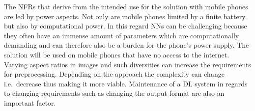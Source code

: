 The \acp{NFR} that derive from the intended use for the solution with mobile phones are led by
power aspects.
Not only are mobile phones limited by a finite battery but also by computational power.
In this regard \acp{NN} can be challenging because they often have an immense amount of parameters
which are computationally demanding and can therefore also be a burden for the phone's power supply.
The solution will be used on mobile phones that have no access to the internet.
Varying aspect ratios in images and such diversities can increase the requirements for preprocessing.
Depending on the approach the complexity can change i.e.\ decrease thus making it more viable.
Maintenance of a \ac{DL} system in regards to changing requirements such as changing the output
format are also an important factor.



